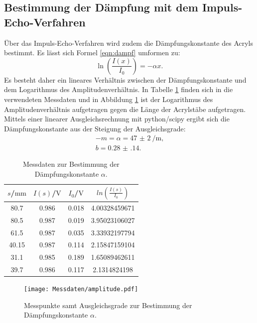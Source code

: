 \subsection{Bestimmung der Dämpfung mit dem Impuls-Echo-Verfahren}
Über das Impuls-Echo-Verfahren wird zudem die Dämpfungskonstante des Acryls bestimmt.
Es lässt sich Formel \eqref{eqn:dampf} umformen zu:
\begin{equation}
  \ln{\left( \frac{I(x)}{I_0}\right)}=-\alpha x \text{.}
\end{equation}
Es besteht daher ein lineares Verhältnis zwischen der Dämpfungskonstante und dem Logarithmus des Amplitudenverhältnis.
In Tabelle \ref{tab:daempf} finden sich in die verwendeten Messdaten und in Abbildung \ref{fig:daempf} ist der Logarithmus des Amplitudenverhältnis aufgetragen gegen die Länge der Acrylstäbe aufgetragen.
Mittels einer linearer Ausgleichsrechnung mit python/scipy \cite{scipy} ergibt sich die Dämpfungskonstante aus der Steigung der Ausgleichsgrade:
\begin{gather*}
-m=\alpha=\SI{47(2)}{\per\meter} \text{,}\\
b=  \num{0.28(14)}\text{.}
\end{gather*}


\begin{table}
\centering
\caption{Messdaten zur Bestimmung der Dämpfungskonstante $\alpha$.}
\label{tab:daempf}
\begin{tabular}{cccc}
  \toprule
$s$/$\si{\milli\meter}$ & $I(s)$/$\si{\volt}$ & $I_0$/$\si{\volt}$ & $ln\left(\frac{I(s)}{I_0}\right)$ \\
\midrule
80.7 & 0.986 & 0.018 & 4.00328459671 \\
80.5 & 0.987 & 0.019 & 3.95023106027 \\
61.5 & 0.987 & 0.035 & 3.33932197794 \\
40.15 & 0.987 & 0.114 & 2.15847159104 \\
31.1 & 0.985 & 0.189 & 1.65089462611 \\
39.7 & 0.986 & 0.117 & 2.1314824198 \\
\bottomrule
\end{tabular}
\end{table}

\begin{figure}
  \centering
  \texttt{[image: Messdaten/amplitude.pdf]}
  \caption{Messpunkte samt Ausgleichsgrade zur Bestimmung der Dämpfungskonstante $\alpha$.}
  \label{fig:daempf}
\end{figure}
\FloatBarrier
